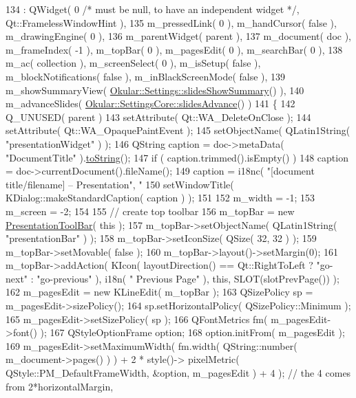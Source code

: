 \begin{DoxyCode}
134     : QWidget( 0 \textcolor{comment}{/* must be null, to have an independent widget */}, Qt::FramelessWindowHint ),
135     m\_pressedLink( 0 ), m\_handCursor( \textcolor{keyword}{false} ), m\_drawingEngine( 0 ),
136     m\_parentWidget( parent ),
137     m\_document( doc ), m\_frameIndex( -1 ), m\_topBar( 0 ), m\_pagesEdit( 0 ), m\_searchBar( 0 ),
138     m\_ac( collection ), m\_screenSelect( 0 ), m\_isSetup( \textcolor{keyword}{false} ), m\_blockNotifications( \textcolor{keyword}{false} ), 
      m\_inBlackScreenMode( \textcolor{keyword}{false} ),
139     m\_showSummaryView( \hyperlink{classOkular_1_1Settings_ac06ca89e428ad1ee40753da80a1f35e5}{Okular::Settings::slidesShowSummary}() ),
140     m\_advanceSlides( \hyperlink{classOkular_1_1SettingsCore_ae778283eb0b083eb09f97f81545f683d}{Okular::SettingsCore::slidesAdvance}() )
141 \{
142     Q\_UNUSED( parent )
143     setAttribute( Qt::WA\_DeleteOnClose );
144     setAttribute( Qt::WA\_OpaquePaintEvent );
145     setObjectName( QLatin1String( "presentationWidget" ) );
146     QString caption = doc->metaData( "DocumentTitle" ).\hyperlink{namespaceQTest_a861302f3f44f1ae8461d2752a3e3813c}{toString}();
147     if ( caption.trimmed().isEmpty() )
148         caption = doc->currentDocument().fileName();
149     caption = i18nc( "[document title/filename] – Presentation", "%
150     setWindowTitle( KDialog::makeStandardCaption( caption ) );
151 
152     m\_width = -1;
153     m\_screen = -2;
154 
155     \textcolor{comment}{// create top toolbar}
156     m\_topBar = new \hyperlink{classPresentationToolBar}{PresentationToolBar}( this );
157     m\_topBar->setObjectName( QLatin1String( "presentationBar" ) );
158     m\_topBar->setIconSize( QSize( 32, 32 ) );
159     m\_topBar->setMovable( false );
160     m\_topBar->layout()->setMargin(0);
161     m\_topBar->addAction( KIcon( layoutDirection() == Qt::RightToLeft ? "go-next" : "go-previous" ), i18n( "
      Previous Page" ), this, SLOT(slotPrevPage()) );
162     m\_pagesEdit = new KLineEdit( m\_topBar );
163     QSizePolicy sp = m\_pagesEdit->sizePolicy();
164     sp.setHorizontalPolicy( QSizePolicy::Minimum );
165     m\_pagesEdit->setSizePolicy( sp );
166     QFontMetrics fm( m\_pagesEdit->font() );
167     QStyleOptionFrame option;
168     option.initFrom( m\_pagesEdit );
169     m\_pagesEdit->setMaximumWidth( fm.width( QString::number( m\_document->pages() ) ) + 2 * style()->
      pixelMetric( QStyle::PM\_DefaultFrameWidth, &option, m\_pagesEdit ) + 4 ); \textcolor{comment}{// the 4 comes from 2*horizontalMargin,
}
\end{DoxyCode}
